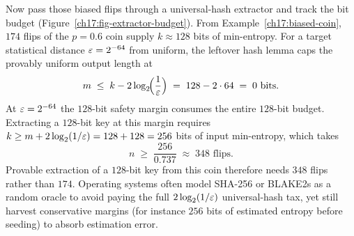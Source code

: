 \begin{example}
\label{ch17:extractor-tax}
Now pass those biased flips through a universal-hash extractor and track the bit budget (Figure~\ref{ch17:fig-extractor-budget}). From Example~\ref{ch17:biased-coin}, $174$ flips of the $p=0.6$ coin supply $k \approx 128$ bits of min-entropy. For a target statistical distance $\varepsilon = 2^{-64}$ from uniform, the leftover hash lemma caps the provably uniform output length at
\[
  m \;\le\; k - 2\log_2\!\Bigl(\frac{1}{\varepsilon}\Bigr) \;=\; 128 - 2 \cdot 64 \;=\; 0 \text{ bits}.
\]
At $\varepsilon = 2^{-64}$ the $128$-bit safety margin consumes the entire $128$-bit budget. Extracting a $128$-bit key at this margin requires $k \ge m + 2\log_2(1/\varepsilon) = 128 + 128 = 256$ bits of input min-entropy, which takes
\[
  n \;\ge\; \frac{256}{0.737} \;\approx\; 348 \text{ flips}.
\]
Provable extraction of a $128$-bit key from this coin therefore needs $348$ flips rather than $174$. Operating systems often model SHA-256 or BLAKE2s as a random oracle to avoid paying the full $2\log_2(1/\varepsilon)$ universal-hash tax, yet still harvest conservative margins (for instance $256$ bits of estimated entropy before seeding) to absorb estimation error.
\end{example}

